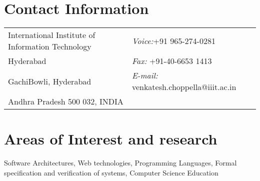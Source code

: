 \documentclass[11pt,margin,line]{res}
\begin{document}

\begin{resume}
\section{\sc Contact Information}
\vspace{.05in}
\begin{tabular}{@{}p{3.5in}p{3in}}
International Institute of Information  Technology  & {\it Voice:}+91 965-274-0281\\
Hyderabad                     &{\it Fax:}    +91-40-6653 1413\\
GachiBowli, Hyderabad        & {\it E-mail:}  venkatesh.choppella@iiit.ac.in\\ 
Andhra Pradesh 500 032, INDIA            & %
\\     
\end{tabular}



\section{\sc Areas of Interest and research}
Software Architectures, Web technologies, Programming
Languages, Formal specification and verification of systems,
Computer Science Education


\end{resume}
\end{document}
